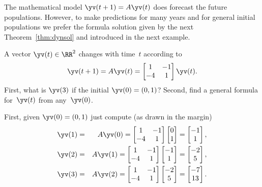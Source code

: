 The mathematical model \(\yv(t+1)=A\yv(t)\) does forecast the future populations.
However, to make predictions for many years and for general initial populations we prefer the formula solution given by the next Theorem~\ref{thm:dynsol} and introduced in the next example.

\begin{example} \label{eg:2x2map}
A vector \(\yv(t)\in\RR^2\) changes with time~\(t\) according to 
\begin{equation*}
\yv(t+1)=A\yv(t)=\begin{bmatrix} 1&-1\\-4&1 \end{bmatrix}\yv(t).
\end{equation*}
First, what is \(\yv(3)\) if the initial \(\yv(0)=(0,1)\)?
Second, find a general formula for~\(\yv(t)\) from any~\(\yv(0)\).
\begin{solution} 
First, given \(\yv(0)=(0,1)\) just compute (as drawn in the margin)
\begin{eqnarray*}
\yv(1)&=&A\yv(0)=\begin{bmatrix} 1&-1\\-4&1 \end{bmatrix}
\begin{bmatrix} 0\\1 \end{bmatrix}
=\begin{bmatrix} -1\\1 \end{bmatrix},
\\\yv(2)&=&A\yv(1)=\begin{bmatrix} 1&-1\\-4&1 \end{bmatrix}
\begin{bmatrix} -1\\1 \end{bmatrix}
=\begin{bmatrix} -2\\5 \end{bmatrix},
\\\yv(3)&=&A\yv(2)=\begin{bmatrix} 1&-1\\-4&1 \end{bmatrix}
\begin{bmatrix} -2\\5 \end{bmatrix}
=\begin{bmatrix} -7\\13 \end{bmatrix}.
\end{eqnarray*}



\end{solution}
\end{example}
